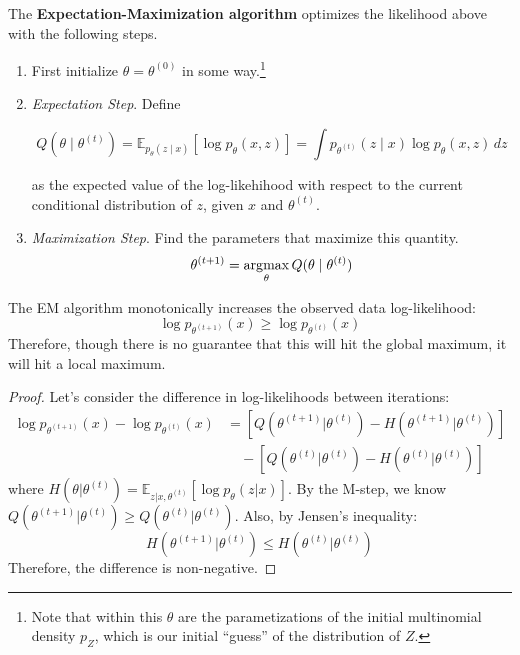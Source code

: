   \begin{algo}[EM Algorithm]
    The \textbf{Expectation-Maximization algorithm} optimizes the likelihood above with the following steps. 
    \begin{enumerate}
      \item First initialize $\theta = \theta^{(0)}$ in some way.\footnote{Note that within this $\theta$ are the parametizations of the initial multinomial density $p_Z$, which is our initial ``guess'' of the distribution of $Z$.}

      \item \textit{Expectation Step}. Define 

      \begin{equation}
        Q(\theta \mid \theta^{(t)}) = \mathbb{E}_{p_\theta (z \mid x)}[ \log p_\theta(x, z) ] = \int p_{\theta^{(t)}} (z \mid x) \log{p_\theta (x, z)} \,dz
      \end{equation}

      as the expected value of the log-likehihood with respect to the current conditional distribution of $z$, given $x$ and $\theta^{(t)}$. 

      \item \textit{Maximization Step}. Find the parameters that maximize this quantity. 
      \begin{equation}
        \theta^{(t+1)} = \argmax_\theta Q(\theta \mid \theta^{(t)})
      \end{equation}
    \end{enumerate}
  \end{algo}

  \begin{theorem}[EM Monotonicity]
    The EM algorithm monotonically increases the observed data log-likelihood:
    \begin{equation}
      \log p_{\theta^{(t+1)}}(x) \geq \log p_{\theta^{(t)}}(x)
    \end{equation}
    Therefore, though there is no guarantee that this will hit the global maximum, it will hit a local maximum. 
  \end{theorem}
  \begin{proof}
    Let's consider the difference in log-likelihoods between iterations:
    \begin{align}
      \log p_{\theta^{(t+1)}}(x) - \log p_{\theta^{(t)}}(x) &= \left[Q(\theta^{(t+1)}|\theta^{(t)}) - H(\theta^{(t+1)}|\theta^{(t)})\right] \\
      &\quad - \left[Q(\theta^{(t)}|\theta^{(t)}) - H(\theta^{(t)}|\theta^{(t)})\right]
    \end{align}
    where $H(\theta|\theta^{(t)}) = \mathbb{E}_{z|x,\theta^{(t)}}[\log p_{\theta}(z|x)]$. By the M-step, we know $Q(\theta^{(t+1)}|\theta^{(t)}) \geq Q(\theta^{(t)}|\theta^{(t)})$. Also, by Jensen's inequality:
    \begin{equation}
      H(\theta^{(t+1)}|\theta^{(t)}) \leq H(\theta^{(t)}|\theta^{(t)})
    \end{equation}
    Therefore, the difference is non-negative.
  \end{proof}

